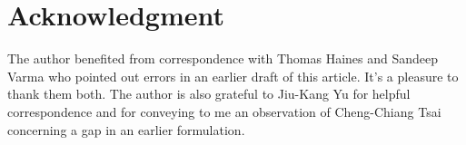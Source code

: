 \documentclass[american]{article}
\numberwithin{equation}{section}
\numberwithin{figure}{section}
\theoremstyle{plain}
\theoremstyle{definition}
\theoremstyle{remark}
\begin{document}
\section*{Acknowledgment}
The author benefited from correspondence with Thomas Haines and Sandeep Varma who pointed out errors in an earlier draft of this article. It's a pleasure to thank them both. The author is also grateful to Jiu-Kang Yu for helpful correspondence and for conveying to me an observation of Cheng-Chiang Tsai concerning a gap in an earlier formulation.



\end{document}
